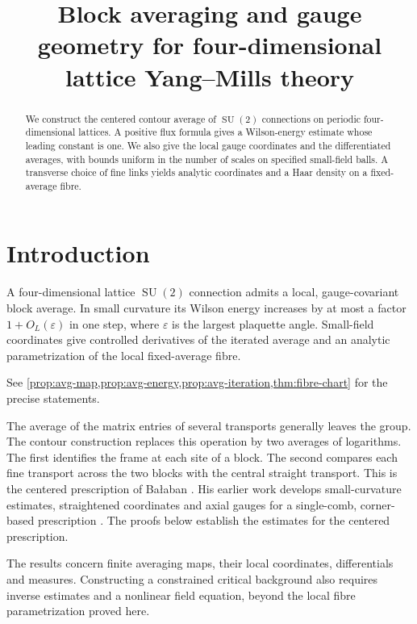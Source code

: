 \documentclass[11pt,letterpaper,reqno]{amsart}
\title[Block averaging and gauge geometry]{Block averaging and gauge geometry for four-dimensional lattice Yang--Mills theory}
\date{}
\numberwithin{equation}{section}
\theoremstyle{definition}
\theoremstyle{remark}
\begin{document}
\begin{abstract}
We construct the centered contour average of \(\operatorname{SU}(2)\)
connections on periodic four-dimensional lattices. A positive flux
formula gives a Wilson-energy estimate whose leading constant is one.
We also give the local gauge coordinates and the differentiated
averages, with bounds uniform in the number of scales on specified
small-field balls. A transverse choice of fine links yields analytic
coordinates and a Haar density on a fixed-average fibre.
\end{abstract}
\maketitle
\tableofcontents

\section{Introduction}\label{sec:introduction}

A four-dimensional lattice \(\operatorname{SU}(2)\) connection
admits a local, gauge-covariant block average. In small curvature its
Wilson energy increases by at most a factor \(1+O_L(\varepsilon)\) in
one step, where \(\varepsilon\) is the largest plaquette angle.
Small-field coordinates give controlled derivatives of the iterated
average and an analytic parametrization of the local fixed-average
fibre.

See \cref{prop:avg-map,prop:avg-energy,prop:avg-iteration,thm:fibre-chart}
for the precise statements.

The average of the matrix entries of several transports generally
leaves the group. The contour construction replaces this operation
by two averages of logarithms. The first identifies the frame at
each site of a block. The second compares each fine transport across
the two blocks with the central straight transport. This is the
centered prescription of Ba\l aban \cite[pp.~252--253,
eqs.~(0.10)--(0.12)]{Bal87}. His earlier work develops small-curvature
estimates, straightened coordinates and axial gauges for a
single-comb, corner-based prescription
\cite[\S\S B--F]{Bal85a}\cite[\S B]{Bal85g}.
The proofs below establish the estimates for the centered prescription.

The results concern finite averaging maps, their local coordinates,
differentials and measures. Constructing a constrained critical
background also requires inverse estimates and a nonlinear field
equation, beyond the local fibre parametrization proved here.
\end{document}
